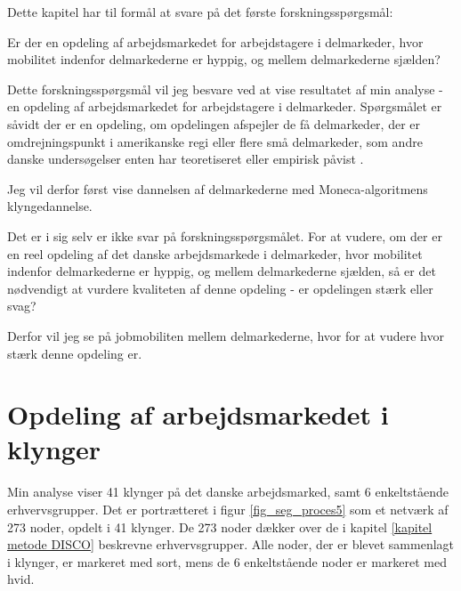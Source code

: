 Dette kapitel har til formål at svare på det første forskningsspørgsmål:

\begin{tcolorbox}[title=Forskningspørgsmål,
subtitle style={boxrule=0.4pt} ]
	 Er der en opdeling af arbejdsmarkedet for arbejdstagere i delmarkeder, hvor mobilitet indenfor delmarkederne er hyppig, og mellem delmarkederne sjælden?
\end{tcolorbox}

Dette forskningsspørgsmål vil jeg besvare ved at vise resultatet af min analyse - en opdeling af arbejdsmarkedet for arbejdstagere i delmarkeder. Spørgsmålet er såvidt der er en opdeling, om opdelingen afspejler de få delmarkeder, der er omdrejningspunkt i amerikanske regi \parencite{Piore1980, Gordon1982} eller flere små delmarkeder, som andre danske undersøgelser enten har teoretiseret eller empirisk påvist \parencite{Boje1985, Touboel2013}.

Jeg vil derfor først vise dannelsen af delmarkederne med Moneca-algoritmens klyngedannelse.

Det er i sig selv er ikke svar på forskningsspørgsmålet. For at vudere, om der er en reel opdeling af det danske arbejdsmarkede i delmarkeder, hvor mobilitet indenfor delmarkederne er hyppig, og mellem delmarkederne sjælden, så er det nødvendigt at vurdere kvaliteten af denne opdeling - er opdelingen stærk eller svag?

Derfor vil jeg se på jobmobiliten mellem delmarkederne, hvor for at vudere hvor stærk denne opdeling er. 

\section{Opdeling af arbejdsmarkedet i klynger \label{delanalyse1_endelige mobilitetskort}}

Min analyse viser 41 klynger på det danske arbejdsmarked, samt 6 enkeltstående erhvervsgrupper. Det er portrætteret i figur \ref{fig_seg_proces5} som et netværk af 273 noder, opdelt i 41 klynger. De 273 noder dækker over de i kapitel \ref{kapitel metode DISCO} beskrevne erhvervsgrupper. Alle noder, der er blevet sammenlagt i klynger, er markeret med sort, mens de 6 enkeltstående noder er markeret med hvid. 




